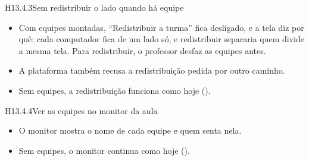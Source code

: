 \begin{historia}{H13.4.3}{Sem redistribuir o lado quando há equipe}{\pronto}
\aceite
\begin{itemize}
  \item Com equipes montadas, \enquote{Redistribuir a turma} fica desligado, e
    a tela diz por quê: cada computador fica de um lado só, e redistribuir
    separaria quem divide a mesma tela. Para redistribuir, o professor desfaz as
    equipes antes.
  \item A plataforma também recusa a redistribuição pedida por outro caminho.
  \item Sem equipes, a redistribuição funciona como hoje ().
\end{itemize}
\end{historia}

\begin{historia}{H13.4.4}{Ver as equipes no monitor da aula}{\afazer}
\aceiteproposta
\begin{itemize}
  \item O monitor mostra o nome de cada equipe e quem senta nela.
  \item Sem equipes, o monitor continua como hoje ().
\end{itemize}
\end{historia}
